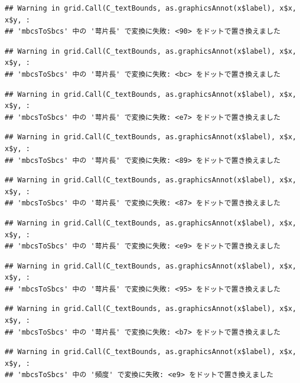 \documentclass[
]{book}
\begin{document}
\begin{verbatim}
## Warning in grid.Call(C_textBounds, as.graphicsAnnot(x$label), x$x, x$y, :
## 'mbcsToSbcs' 中の '萼片長' で変換に失敗: <90> をドットで置き換えました
\end{verbatim}

\begin{verbatim}
## Warning in grid.Call(C_textBounds, as.graphicsAnnot(x$label), x$x, x$y, :
## 'mbcsToSbcs' 中の '萼片長' で変換に失敗: <bc> をドットで置き換えました
\end{verbatim}

\begin{verbatim}
## Warning in grid.Call(C_textBounds, as.graphicsAnnot(x$label), x$x, x$y, :
## 'mbcsToSbcs' 中の '萼片長' で変換に失敗: <e7> をドットで置き換えました
\end{verbatim}

\begin{verbatim}
## Warning in grid.Call(C_textBounds, as.graphicsAnnot(x$label), x$x, x$y, :
## 'mbcsToSbcs' 中の '萼片長' で変換に失敗: <89> をドットで置き換えました
\end{verbatim}

\begin{verbatim}
## Warning in grid.Call(C_textBounds, as.graphicsAnnot(x$label), x$x, x$y, :
## 'mbcsToSbcs' 中の '萼片長' で変換に失敗: <87> をドットで置き換えました
\end{verbatim}

\begin{verbatim}
## Warning in grid.Call(C_textBounds, as.graphicsAnnot(x$label), x$x, x$y, :
## 'mbcsToSbcs' 中の '萼片長' で変換に失敗: <e9> をドットで置き換えました
\end{verbatim}

\begin{verbatim}
## Warning in grid.Call(C_textBounds, as.graphicsAnnot(x$label), x$x, x$y, :
## 'mbcsToSbcs' 中の '萼片長' で変換に失敗: <95> をドットで置き換えました
\end{verbatim}

\begin{verbatim}
## Warning in grid.Call(C_textBounds, as.graphicsAnnot(x$label), x$x, x$y, :
## 'mbcsToSbcs' 中の '萼片長' で変換に失敗: <b7> をドットで置き換えました
\end{verbatim}

\begin{verbatim}
## Warning in grid.Call(C_textBounds, as.graphicsAnnot(x$label), x$x, x$y, :
## 'mbcsToSbcs' 中の '頻度' で変換に失敗: <e9> をドットで置き換えました
\end{verbatim}
\end{document}
